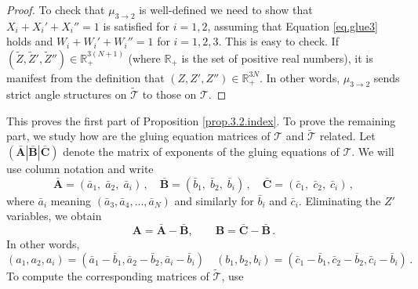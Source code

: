 \documentclass[12pt]{amsart}
\theoremstyle{definition}
\def\BR{\mathbb R}
\def\calT{\mathcal T}
\def\be{  \begin{equation} }
\def\ee{  \end{equation} }
\newcommand{\mb}{\mathbf}
\newcommand{\wt}{\widetilde}
\numberwithin{equation}{section}
\begin{document}
\begin{proof}
To check that $\mu_{3 \to 2}$ is well-defined
we need to show that $X_i+X_i'+X_i''=1$ is satisfied for $i=1,2$, assuming that 
Equation \eqref{eq.glue3} holds and 
$W_i+W_i'+W_i''=1$ for $i=1,2,3$. This is easy to check. If 
$(\wt Z,\wt Z',\wt Z'') \in \BR_+^{3(N+1)}$ (where $\BR_+$ is the set of 
positive real numbers), it is manifest from the definition that 
$(Z,Z',Z'') \in \BR_+^{3N}$. In other words, $\mu_{3\to 2}$ sends 
strict angle structures on $\wt{\calT}$ to those on $\calT$.
\end{proof}
This proves the first part of Proposition \ref{prop.3.2.index}.
To prove the remaining part, we study how are the gluing equation matrices
of $\calT$ and $\wt{\calT}$ related. Let $(\bar{\mb A}|\bar{\mb B}|\bar{\mb  C})$ 
denote the matrix of exponents of the gluing equations of $\calT$. We will 
use column notation and write
$$
\bar{\mb A} = (\bar a_1,\;\bar a_2,\;\bar a_i)\,,\quad 
\bar{\mb B} = (\bar b_1,\;\bar b_2,\;\bar b_i)\,,\quad
\bar{\mb C} = (\bar c_1,\;\bar c_2,\;\bar c_i)\,,
$$
where $\bar a_i$ meaning $(\bar a_3,\bar a_4,...,\bar a_N)$ and similarly for 
$\bar b_i$ and $\bar c_i$. Eliminating the $Z'$ variables, we obtain
$$
\mb A = \bar{\mb A} - \bar{\mb B}, \qquad
\mb B = \bar{\mb C} - \bar{\mb B} \,.
$$
In other words, 
\be
\label{eq.a1b1}
(a_1, a_2, a_i)=(\bar a_1 - \bar b_1, \bar a_2 - \bar b_2, \bar a_i - \bar b_i)
\quad
(b_1, b_2, b_i)=(\bar c_1 - \bar b_1, \bar c_2 - \bar b_2, \bar c_i - \bar b_i)
\,.
\ee
To compute the corresponding matrices of $\wt{\calT}$, use
\end{document}
